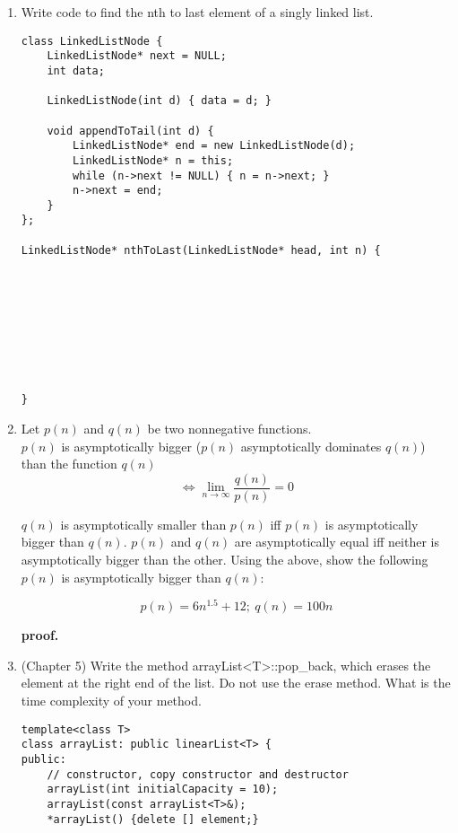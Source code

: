 \begin{enumerate}
    \item Write code to find the nth to last element of a singly linked list.
    \begin{verbatim}
class LinkedListNode {
    LinkedListNode* next = NULL;
    int data;

    LinkedListNode(int d) { data = d; }

    void appendToTail(int d) {
        LinkedListNode* end = new LinkedListNode(d);
        LinkedListNode* n = this;
        while (n->next != NULL) { n = n->next; }
        n->next = end;
    }
};

LinkedListNode* nthToLast(LinkedListNode* head, int n) {
    








}
    \end{verbatim}
    \newpage
    \item Let $p(n)$ and $q(n)$ be two nonnegative functions.\\
    $p(n)$ is asymptotically bigger ($p(n)$ asymptotically dominates $q(n)$) than the function $q(n)$\\
    
    \begin{equation}
        \iff \lim_{n\to\infty}\frac{q(n)}{p(n)}=0
    \end{equation}
    
    $q(n)$ is asymptotically smaller than $p(n)$ iff $p(n)$ is asymptotically bigger than $q(n)$.
    $p(n)$ and $q(n)$ are asymptotically equal iff neither is asymptotically bigger than the other.
    Using the above, show the following $p(n)$ is asymptotically bigger than $q(n)$:
    
    \begin{equation}
        p(n) = 6n^{1.5} + 12;\ q(n) = 100n
    \end{equation}
    
    \textbf{proof.}
    \newpage
    \item (Chapter 5) Write the method {\ttfamily arrayList<T>::pop\_back}, which erases the element at the right end of the list.
    Do not use the erase method. What is the time complexity of your method.
    \begin{verbatim}
template<class T>
class arrayList: public linearList<T> {
public:
    // constructor, copy constructor and destructor
    arrayList(int initialCapacity = 10);
    arrayList(const arrayList<T>&);
    *arrayList() {delete [] element;}


\end{verbatim}
\end{enumerate}
